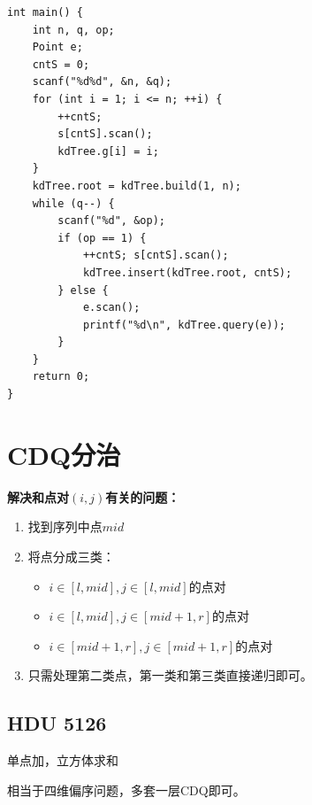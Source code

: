 \begin{lstlisting}
int main() {
	int n, q, op;
    Point e;
	cntS = 0;
	scanf("%d%d", &n, &q); 
	for (int i = 1; i <= n; ++i) {
		++cntS;
		s[cntS].scan();
		kdTree.g[i] = i;
	}
	kdTree.root = kdTree.build(1, n);
	while (q--) {
		scanf("%d", &op);
		if (op == 1) {
			++cntS; s[cntS].scan();
			kdTree.insert(kdTree.root, cntS);
		} else {
			e.scan();
			printf("%d\n", kdTree.query(e));
		}
	}
	return 0;
}
\end{lstlisting}

\section{CDQ分治}

\textbf{解决和点对$(i, j)$有关的问题：}\par
\begin{enumerate}
\item 找到序列中点$mid$
\item 将点分成三类：
\begin{itemize}
\item $i \in [l, mid], j \in [l, mid]$的点对
\item $i \in [l, mid], j \in [mid + 1, r]$的点对
\item $i \in [mid + 1, r], j \in [mid + 1, r]$的点对
\end{itemize}
\item 只需处理第二类点，第一类和第三类直接递归即可。
\end{enumerate}

\subsection{HDU 5126}

单点加，立方体求和\par
相当于四维偏序问题，多套一层CDQ即可。\par

